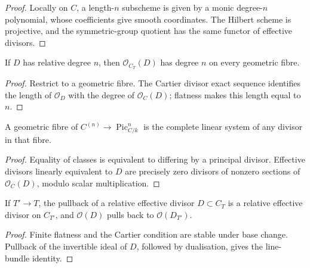 \begin{proof}
  Locally on \(C\), a length-\(n\) subscheme is given by a monic degree-\(n\)
  polynomial, whose coefficients give smooth coordinates.  The Hilbert scheme
  is projective, and the symmetric-group quotient has the same functor of
  effective divisors.
\end{proof}

\begin{lemma}
  \label{pa-lem-effective-divisor-degree}
  \cite{kleiman-picard}
  If \(D\) has relative degree \(n\), then \(\mathcal O_{C_T}(D)\) has degree
  \(n\) on every geometric fibre.
\end{lemma}

\begin{proof}
  Restrict to a geometric fibre.  The Cartier divisor exact sequence identifies
  the length of \(\mathcal O_D\) with the degree of
  \(\mathcal O_C(D)\); flatness makes this length equal to \(n\).
\end{proof}

\begin{lemma}
  \label{pa-lem-effective-map-fibres}
  \cite{kleiman-picard}
  A geometric fibre of \(C^{(n)}\to\operatorname{Pic}^n_{C/k}\) is the complete
  linear system of any divisor in that fibre.
\end{lemma}

\begin{proof}
  Equality of classes is equivalent to differing by a principal divisor.
  Effective divisors linearly equivalent to \(D\) are precisely zero divisors of
  nonzero sections of \(\mathcal O_C(D)\), modulo scalar multiplication.
\end{proof}

\begin{lemma}
  \label{pa-lem-relative-divisor-base-change}
  \cite{kleiman-picard}
  If \(T'\to T\), the pullback of a relative effective divisor
  \(D\subset C_T\) is a relative effective divisor on \(C_{T'}\), and
  \(\mathcal O(D)\) pulls back to \(\mathcal O(D_{T'})\).
\end{lemma}

\begin{proof}
  Finite flatness and the Cartier condition are stable under base change.
  Pullback of the invertible ideal of \(D\), followed by dualisation, gives
  the line-bundle identity.
\end{proof}

